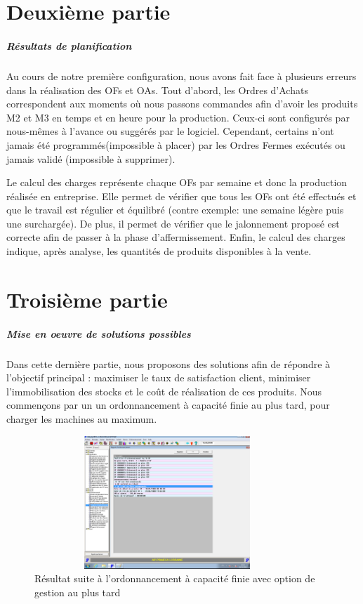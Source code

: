 \documentclass{scrreprt}
\begin{document}
\chapter{Deuxième partie} 

\paragraph{Résultats de planification}

Au cours de notre première configuration, nous avons fait face à plusieurs erreurs dans la réalisation des OFs et OAs. Tout d'abord, les Ordres d'Achats correspondent aux moments où nous passons commandes afin d'avoir les produits M2 et M3 en temps et en heure pour la production. Ceux-ci sont configurés par nous-mêmes à l'avance ou suggérés par le logiciel. Cependant, certains n'ont jamais été programmés(impossible à placer) par les Ordres Fermes exécutés  ou jamais validé (impossible à supprimer). 

Le calcul des charges représente chaque OFs par semaine et donc la production réalisée en entreprise.
Elle permet de vérifier que tous les OFs ont été effectués et que le travail est régulier et équilibré
(contre exemple: une semaine légère puis une surchargée). De plus, il permet de vérifier que le jalonnement proposé est correcte afin de passer à la phase d'affermissement. Enfin, le calcul des charges indique, après analyse, les quantités de produits disponibles à la vente.



\chapter{Troisième partie}

\paragraph{Mise en oeuvre de solutions possibles}

Dans cette dernière partie, nous proposons des solutions afin de répondre à l'objectif principal : maximiser le taux de satisfaction client, minimiser l'immobilisation des stocks et
le coût de réalisation de ces produits. Nous commençons par un un ordonnancement à capacité finie au plus tard, pour charger les machines au maximum.


\begin{figure}[!h]
\centering
\includegraphics[width=10cm, height=5cm]{rapportAuPlusTard.png}
\caption{Résultat suite à l'ordonnancement à capacité finie avec option de gestion au plus tard}
\end{figure}
\end{document}
